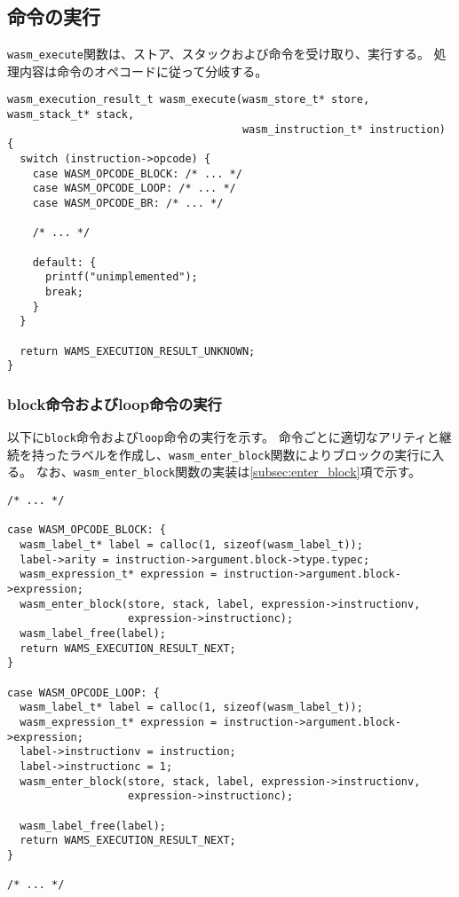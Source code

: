 \subsection{命令の実行}
\label{subsec:execute}

\verb|wasm_execute|関数は、ストア、スタックおよび命令を受け取り、実行する。
処理内容は命令のオペコードに従って分岐する。

\begin{lstlisting}[caption=命令の実行,label=lst:parse_sleb128]
wasm_execution_result_t wasm_execute(wasm_store_t* store, wasm_stack_t* stack,
                                     wasm_instruction_t* instruction) {
  switch (instruction->opcode) {
    case WASM_OPCODE_BLOCK: /* ... */
    case WASM_OPCODE_LOOP: /* ... */
    case WASM_OPCODE_BR: /* ... */

    /* ... */

    default: {
      printf("unimplemented");
      break;
    }
  }

  return WAMS_EXECUTION_RESULT_UNKNOWN;
}
\end{lstlisting}

\subsubsection{block命令およびloop命令の実行}

以下に\verb|block|命令および\verb|loop|命令の実行を示す。
命令ごとに適切なアリティと継続を持ったラベルを作成し、\verb|wasm_enter_block|関数によりブロックの実行に入る。
なお、\verb|wasm_enter_block|関数の実装は\ref{subsec:enter_block}項で示す。

\begin{lstlisting}[caption=命令の実装,label=lst:parse_sleb128]
/* ... */

case WASM_OPCODE_BLOCK: {
  wasm_label_t* label = calloc(1, sizeof(wasm_label_t));
  label->arity = instruction->argument.block->type.typec;
  wasm_expression_t* expression = instruction->argument.block->expression;
  wasm_enter_block(store, stack, label, expression->instructionv,
                   expression->instructionc);
  wasm_label_free(label);
  return WAMS_EXECUTION_RESULT_NEXT;
}

case WASM_OPCODE_LOOP: {
  wasm_label_t* label = calloc(1, sizeof(wasm_label_t));
  wasm_expression_t* expression = instruction->argument.block->expression;
  label->instructionv = instruction;
  label->instructionc = 1;
  wasm_enter_block(store, stack, label, expression->instructionv,
                   expression->instructionc);

  wasm_label_free(label);
  return WAMS_EXECUTION_RESULT_NEXT;
}

/* ... */
\end{lstlisting}

